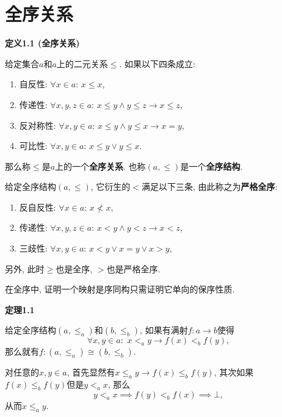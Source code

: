 \documentclass[UTF8]{ctexart}
\begin{document}
\setlength{\abovedisplayskip}{1pt}
\setlength{\belowdisplayskip}{1pt}

\section{全序关系}

\hypertarget{sec:定义1.1}{}
\noindent\textbf{定义1.1 (全序关系)}

给定集合$a$和$a$上的二元关系$\leqslant$. 如果以下四条成立:
\begin{enumerate}
    \item 自反性: $\forall x\in a:\,x\leqslant x$,
    \item 传递性: $\forall x,y,z\in a:\,
    x\leqslant y\land y\leqslant z\to x\leqslant z$,
    \item 反对称性: $\forall x,y\in a:\,x\leqslant y\land y\leqslant x\to x=y$,
    \item 可比性: $\forall x,y\in a:\,x\leqslant y\lor y\leqslant x$.
\end{enumerate}
那么称$\leqslant$是$a$上的一个\textbf{全序关系}.
也称$(a,\leqslant)$是一个\textbf{全序结构}.

\vspace{10pt}

给定全序结构$(a,\leqslant)$, 它衍生的$<$满足以下三条, 由此称之为\textbf{严格全序}:
\begin{enumerate}
    \item 反自反性: $\forall x\in a:\,x\nless x$,
    \item 传递性: $\forall x,y,z\in a:\,x<y\land y<z\to x<z$,
    \item 三歧性: $\forall x,y\in a:\,x<y\lor x=y\lor x>y$,
\end{enumerate}
另外, 此时$\geqslant$也是全序, $>$也是严格全序.

\vspace{10pt}

在全序中, 证明一个映射是序同构只需证明它单向的保序性质.

\vspace{10pt}

\hypertarget{sec:定理1.1}{}
\noindent\textbf{定理1.1}

给定全序结构$(a,\leqslant_a)$和$(b,\leqslant_b)$, 如果有满射$f:a\to b$使得
\[
    \forall x,y\in a:\,\,x<_ay\to f(x)<_bf(y),
\]
那么就有$f:(a,\leqslant_a)\cong(b,\leqslant_b)$.


对任意的$x,y\in a$, 首先显然有$x\leqslant_ay\to f(x)\leqslant_bf(y)$,
其次如果$f(x)\leqslant_bf(y)$但是$y<_ax$, 那么
\[
    y<_ax\implies f(y)<_bf(x)\implies\bot,
\]
从而$x\leqslant_ay$.
\end{document}
